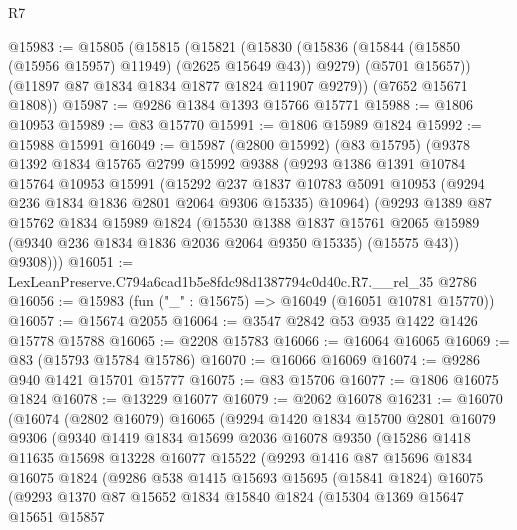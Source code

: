 \begin{lexlean}{R7}
\begin{coremodule}
@15983 := @15805
    (@15815
      (@15821
        (@15830
          (@15836 (@15844 (@15850 (@15956 @15957) @11949) (@2625 @15649 @43)) @9279)
          (@5701 @15657))
        (@11897 @87 @1834 @1834 @1877 @1824 @11907 @9279))
      (@7652 @15671 @1808))
@15987 := @9286 @1384 @1393 @15766 @15771
@15988 := @1806 @10953
@15989 := @83 @15770
@15991 := @1806 @15989 @1824
@15992 := @15988 @15991
@16049 := @15987
    (@2800 @15992)
    (@83 @15795)
    (@9378
      @1392
      @1834
      @15765
      @2799
      @15992
      @9388
      (@9293
        @1386
        @1391
        @10784
        @15764
        @10953
        @15991
        (@15292
          @237
          @1837
          @10783
          @5091
          @10953
          (@9294 @236 @1834 @1836 @2801 @2064 @9306 @15335)
          @10964)
        (@9293
          @1389
          @87
          @15762
          @1834
          @15989
          @1824
          (@15530
            @1388
            @1837
            @15761
            @2065
            @15989
            (@9340 @236 @1834 @1836 @2036 @2064 @9350 @15335)
            (@15575 @43))
          @9308)))
@16051 := LexLeanPreserve.C794a6cad1b5e8fdc98d1387794c0d40c.R7.__rel_35 @2786
@16056 := @15983 (fun ("_" : @15675) => @16049 (@16051 @10781 @15770))
@16057 := @15674 @2055
@16064 := @3547 @2842 @53 @935 @1422 @1426 @15778 @15788
@16065 := @2208 @15783
@16066 := @16064 @16065
@16069 := @83 (@15793 @15784 @15786)
@16070 := @16066 @16069
@16074 := @9286 @940 @1421 @15701 @15777
@16075 := @83 @15706
@16077 := @1806 @16075 @1824
@16078 := @13229 @16077
@16079 := @2062 @16078
@16231 := @16070
    (@16074
      (@2802 @16079)
      @16065
      (@9294
        @1420
        @1834
        @15700
        @2801
        @16079
        @9306
        (@9340
          @1419
          @1834
          @15699
          @2036
          @16078
          @9350
          (@15286
            @1418
            @11635
            @15698
            @13228
            @16077
            @15522
            (@9293
              @1416
              @87
              @15696
              @1834
              @16075
              @1824
              (@9286
                @538
                @1415
                @15693
                @15695
                (@15841 @1824)
                @16075
                (@9293
                  @1370
                  @87
                  @15652
                  @1834
                  @15840
                  @1824
                  (@15304
                    @1369
                    @15647
                    @15651
                    @15857

\end{coremodule}
\end{lexlean}
